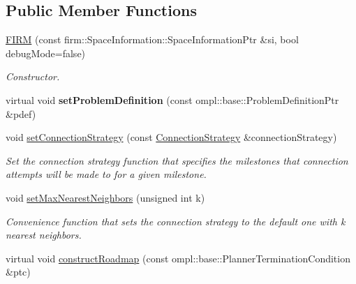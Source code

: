 \subsection*{\-Public \-Member \-Functions}
\begin{DoxyCompactItemize}
\item 
\hypertarget{class_f_i_r_m_a451aef223259f497ec178ad8447d04d5}{\hyperlink{class_f_i_r_m_a451aef223259f497ec178ad8447d04d5}{\-F\-I\-R\-M} (const firm\-::\-Space\-Information\-::\-Space\-Information\-Ptr \&si, bool debug\-Mode=false)}\label{class_f_i_r_m_a451aef223259f497ec178ad8447d04d5}

\begin{DoxyCompactList}\small\item\em \-Constructor. \end{DoxyCompactList}\item 
\hypertarget{class_f_i_r_m_a09a7ff97d8202a82ca7f6dddfd7ba185}{virtual void {\bfseries set\-Problem\-Definition} (const ompl\-::base\-::\-Problem\-Definition\-Ptr \&pdef)}\label{class_f_i_r_m_a09a7ff97d8202a82ca7f6dddfd7ba185}

\item 
void \hyperlink{class_f_i_r_m_a8017d1847e682f39c2cbce33e904af57}{set\-Connection\-Strategy} (const \hyperlink{class_f_i_r_m_a15cfbcaf52c0bdd5e6c1a969bbf7ea1e}{\-Connection\-Strategy} \&connection\-Strategy)
\begin{DoxyCompactList}\small\item\em \-Set the connection strategy function that specifies the milestones that connection attempts will be made to for a given milestone. \end{DoxyCompactList}\item 
\hypertarget{class_f_i_r_m_a2a87b6c094c21b956a469a2b69cd387c}{void \hyperlink{class_f_i_r_m_a2a87b6c094c21b956a469a2b69cd387c}{set\-Max\-Nearest\-Neighbors} (unsigned int k)}\label{class_f_i_r_m_a2a87b6c094c21b956a469a2b69cd387c}

\begin{DoxyCompactList}\small\item\em \-Convenience function that sets the connection strategy to the default one with k nearest neighbors. \end{DoxyCompactList}\item 
\hypertarget{class_f_i_r_m_a5f2e6a8c5dac3a0629f1dd0ac2313b9c}{virtual void \hyperlink{class_f_i_r_m_a5f2e6a8c5dac3a0629f1dd0ac2313b9c}{construct\-Roadmap} (const ompl\-::base\-::\-Planner\-Termination\-Condition \&ptc)}\label{class_f_i_r_m_a5f2e6a8c5dac3a0629f1dd0ac2313b9c}


\end{DoxyCompactItemize}
